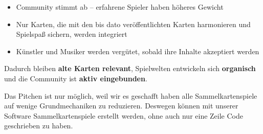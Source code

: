 \documentclass[fontsize=12]{scrartcl}
\begin{document}
	\begin{itemize}
		
		\item Community stimmt ab -- erfahrene Spieler haben höheres Gewicht
		
		\item Nur Karten, die mit den bis dato veröffentlichten Karten harmonieren und Spielspaß sichern, werden integriert
		
		\item Künstler und Musiker werden vergütet, sobald ihre Inhalte akzeptiert werden
		
	\end{itemize}
	
	\noindent Dadurch bleiben \textbf{alte Karten relevant}, Spielwelten entwickeln sich \textbf{organisch} und die Community ist \textbf{aktiv eingebunden}.\hfill\newline
	
	
	\noindent Das Pitchen ist nur möglich, weil wir es geschafft haben alle Sammelkartenspiele auf wenige Grundmechaniken zu reduzieren. Deswegen können mit unserer Software Sammelkartenspiele erstellt werden, ohne auch nur eine Zeile Code geschrieben zu haben.\hfill\newline
	
	
\end{document}
